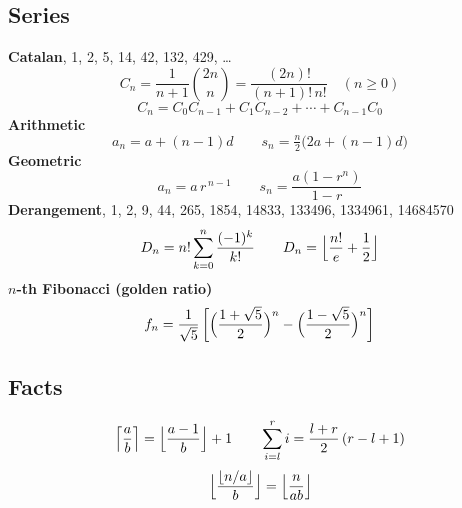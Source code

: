 \subsection{Series}
\noindent\textbf{Catalan}, 1, 2, 5, 14, 42, 132, 429, \dots
\[C_n=\frac{1}{n+1}\binom{2n}{n}=\frac{(2n)!}{(n+1)!\,n!}\quad (n\ge 0)\]
\[C_n=C_0C_{n-1}+C_1C_{n-2}+\cdots+C_{n-1}C_0\]
\noindent\textbf{Arithmetic}
\[a_n=a+(n-1)d\qquad s_n=\tfrac{n}{2}\bigl(2a+(n-1)d\bigr)\]
\noindent\textbf{Geometric}
\[a_n=a\,r^{\,n-1}\qquad s_n=\frac{a(1-r^n)}{1-r}\]
\noindent\textbf{Derangement}, 1, 2, 9, 44, 265, 1854,
14833, 133496, 1334961, 14684570
\[D_n=n!\sum_{k=0}^{n}\frac{(-1)^k}{k!}\qquad
  D_n=\Bigl\lfloor\frac{n!}{e}+\frac{1}{2}\Bigr\rfloor\]
\noindent\textbf{$n$-th Fibonacci (golden ratio)}
\[f_n=\frac{1}{\sqrt5}\left[\Bigl(\frac{1+\sqrt5}{2}\Bigr)^{n}-
  \Bigl(\frac{1-\sqrt5}{2}\Bigr)^{n}\right]\]

\subsection{Facts}
\[\Bigl\lceil\frac{a}{b}\Bigr\rceil=\Bigl\lfloor\frac{a-1}{b}\Bigr\rfloor+1
  \qquad
  \sum_{i=l}^{r} i=\frac{l+r}{2}\,(r-l+1)\]
\[\Bigl\lfloor\frac{\lfloor n/a\rfloor}{b}\Bigr\rfloor
  =\Bigl\lfloor\frac{n}{ab}\Bigr\rfloor\]
